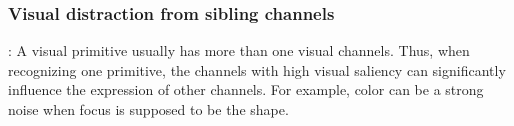 \subsubsection{Visual distraction from sibling channels}: A visual primitive usually has more than one visual channels. Thus, when recognizing one primitive, the channels with high visual saliency can significantly influence the expression of other channels. For example, color can be a strong noise when focus is supposed to be the shape.
